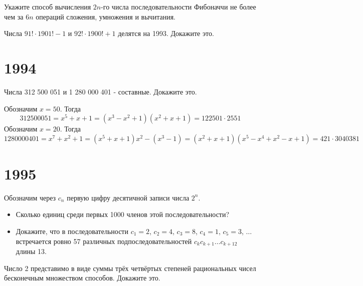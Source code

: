 \documentclass[11pt, a4paper]{problems_template}
\begin{document}
\begin{exercise}[1338]
Укажите способ вычисления $2n$-го числа последовательности Фибоначчи не более чем за $6n$ операций сложения, умножения и вычитания.
\end{exercise}

\begin{exercise}[1357]
Числа $91! \cdot 1901! - 1$ и $92! \cdot 1900! + 1$ делятся на 1993. Докажите это.
\end{exercise}

\begin{Solution}

\end{Solution}

\chapter{1994}

\begin{exercise}[1422]
Числа 312 500 051 и 1 280 000 401 - составные. Докажите это.
\end{exercise}

\begin{Solution}
Обозначим $x = 50$. Тогда
$$
312 500 051 = x^{5} + x + 1 = (x^{3} - x^{2} + 1)(x^{2} + x + 1) = 122501 \cdot 2551
$$
Обозначим $x = 20$. Тогда
$$
1 280 000 401 = x^{7} + x^{2} + 1 = (x^{5} + x + 1)x^{2} - (x^{3} - 1) = (x^{2} + x + 1)(x^{5} - x^{4} + x^{2} - x + 1) = 421 \cdot 3040381
$$
\end{Solution}

\chapter{1995}

\begin{exercise}[1473]
Обозначим через $c_{n}$ первую цифру десятичной записи числа $2^{n}$. 
\begin{itemize}
\item Сколько единиц среди первых 1000 членов этой последовательности?
\item Докажите, что в последовательности $c_{1} = 2$, $c_{2} = 4$, $c_{3} = 8$, $c_{4} = 1$, $c_{5} = 3$, $\dots$ встречается ровно 57 различных подпоследовательностей $c_{k}c_{k+1}\dots c_{k+12}$ длины 13.
\end{itemize} 
\end{exercise}

\begin{exercise}[1499]
Число 2 представимо в виде суммы трёх четвёртых степеней рациональных чисел бесконечным множеством способов. Докажите это.
\end{exercise}
\end{document}
